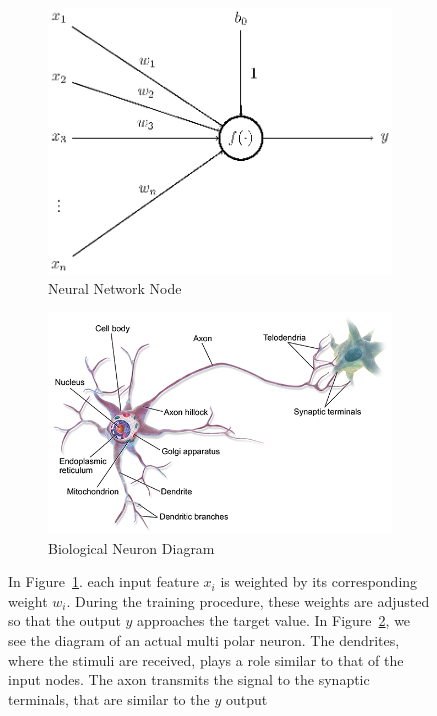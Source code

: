 \begin{figure}[!H]
	\begin{subfigure}{0.5\linewidth}
		\centering
		\includegraphics[width=0.9\linewidth]{figures/neuron.eps}
		\caption{Neural Network Node}
		\label{fig:modelNeuron_a}
	\end{subfigure}
	\begin{subfigure}{0.5\linewidth}
		\centering
		\includegraphics[width=0.9\linewidth]{figures/multipolarNeuron.png}
		\caption{Biological Neuron Diagram}
		\label{fig:modelNeuron_b}
	\end{subfigure}
		
	\caption{In Figure~\ref{fig:modelNeuron_a}. each input feature $x_i$ is weighted by its corresponding weight $w_i$. During the training procedure, these weights are adjusted so that the output $y$ approaches the target value. In Figure~\ref{fig:modelNeuron_b}, we see the diagram of an actual multi polar neuron. The dendrites, where the stimuli are received, plays a role similar to that of the input nodes. The axon transmits the signal to the synaptic terminals, that are similar to the $y$ output}
	\label{fig:modelNeuron}
\end{figure}


